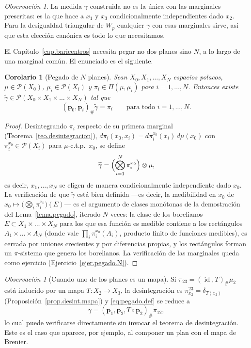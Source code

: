 \documentclass[12pt, a4paper]{amsbook}
\newcommand{\id}{\operatorname{id}}
\newcommand{\pp}{{\mathbf p}}
\newtheorem{cor}[teo]{Corolario}
\theoremstyle{remark}
\newtheorem{obs}[teo]{Observación}
\theoremstyle{definition}
\numberwithin{section}{chapter}
\numberwithin{subsection}{section}
\numberwithin{equation}{section}
\numberwithin{figure}{chapter}
\begin{document}
\begin{obs}
La medida $\gamma$ construida no es la única con las marginales prescritas: es
la que hace a $x_1$ y $x_3$ condicionalmente independientes dado $x_2$. Para
la desigualdad triangular de $W_p$ cualquier $\gamma$ con esas marginales
sirve, así que esta elección canónica es todo lo que necesitamos.
\end{obs}

El Capítulo~\ref{cap.baricentros} necesita pegar no dos planes sino $N$, a lo
largo de una marginal común. El enunciado es el siguiente.

\begin{cor}[Pegado de $N$ planes]\label{cor.pegado.N}
Sean $X_0,X_1,\dots,X_N$ espacios polacos, $\mu\in\mathcal P(X_0)$,
$\mu_i\in\mathcal P(X_i)$ y $\pi_i\in\Pi(\mu,\mu_i)$ para $i=1,\dots,N$.
Entonces existe
$\widetilde\gamma\in\mathcal P(X_0\times X_1\times\dots\times X_N)$ tal que
\[
(\pp_0,\pp_i)_\#\widetilde\gamma=\pi_i
\qquad\text{para todo }i=1,\dots,N.
\]
\end{cor}

\begin{proof}
Desintegrando $\pi_i$ respecto de su primera marginal
(Teorema~\ref{teo.desintegracion}),
$d\pi_i(x_0,x_i)=d\pi_i^{x_0}(x_i)\,d\mu(x_0)$ con
$\pi_i^{x_0}\in\mathcal P(X_i)$ para $\mu$-c.t.p.\ $x_0$, se define
\[
\widetilde\gamma=\Bigl(\bigotimes_{i=1}^N\pi_i^{x_0}\Bigr)\otimes\mu,
\]
es decir, $x_1,\dots,x_N$ se eligen de manera condicionalmente independiente
dado $x_0$. La verificación de que $\widetilde\gamma$ está bien definida
—es decir, la medibilidad en $x_0$ de
$x_0\mapsto\bigl(\bigotimes_i\pi_i^{x_0}\bigr)(E)$— es el argumento de
clases monótonas de la demostración del Lema~\ref{lema.pegado}, iterado $N$
veces: la clase de los borelianos $E\subset X_1\times\dots\times X_N$ para
los que esa función es medible contiene a los rectángulos
$A_1\times\dots\times A_N$ (donde vale
$\prod_i\pi_i^{x_0}(A_i)$, producto finito de funciones medibles), es cerrada
por uniones crecientes y por diferencias propias, y los rectángulos forman un
$\pi$-sistema que genera los borelianos. La verificación de las marginales
queda como ejercicio (Ejercicio~\ref{ejer.pegado.N}).
\end{proof}

\begin{obs}[Cuando uno de los planes es un mapa]\label{obs.pegado.mapa}
Si $\pi_{23}=(\id,T)_\#\mu_2$ está inducido por un mapa $T\colon X_2\to X_3$,
la desintegración es $\pi^{23}_{x_2}=\delta_{T(x_2)}$
(Proposición~\ref{prop.desint.mapa}) y \eqref{eq:pegado.def} se reduce a
\[
\gamma=(\pp_1,\pp_2,T\circ\pp_2)_\#\pi_{12},
\]
lo cual puede verificarse directamente sin invocar el teorema de
desintegración. Este es el caso que aparece, por ejemplo, al componer un plan
con el mapa de Brenier.
\end{obs}
\end{document}
